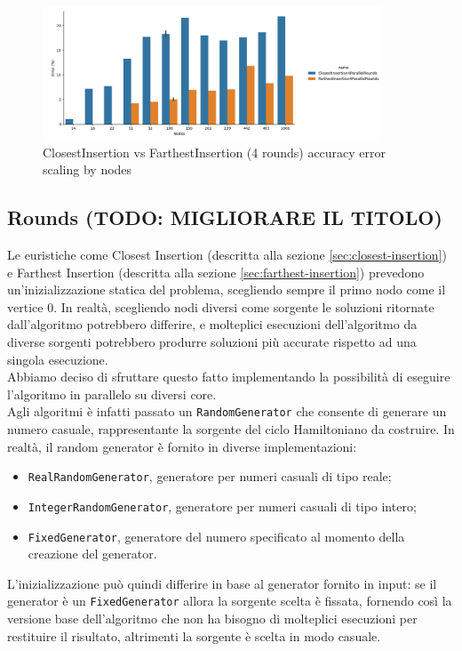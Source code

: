 \begin{figure}[H]
    \centering

    \includegraphics[width=0.9\textwidth]{./images/ClosestInsertion4ParallelRounds_vs_FarthestInsertion4ParallelRounds__approximation_error_.png}

    \caption{ClosestInsertion vs FarthestInsertion (4 rounds) accuracy error scaling by nodes}
    \label{fig:closest-farthest-insertion-4-rounds-accuracy-error}
\end{figure}

\subsection{Rounds (TODO: MIGLIORARE IL TITOLO)}
\label{sec:rounds}

\noindent Le euristiche come Closest Insertion (descritta alla sezione
\ref{sec:closest-insertion}) e Farthest Insertion (descritta alla
sezione \ref{sec:farthest-insertion}) prevedono un'inizializzazione
statica del problema, scegliendo sempre il primo nodo come il vertice
0. In realtà, scegliendo nodi diversi come sorgente le soluzioni
ritornate dall'algoritmo potrebbero differire, e molteplici esecuzioni
dell'algoritmo da diverse sorgenti potrebbero produrre soluzioni più
accurate rispetto ad una singola esecuzione.\\

\noindent Abbiamo deciso di sfruttare questo fatto implementando la
possibilità di eseguire l'algoritmo in parallelo su diversi core.\\

\noindent Agli algoritmi è infatti passato un
\texttt{RandomGenerator} che consente di generare un numero
casuale, rappresentante la sorgente del ciclo Hamiltoniano da
costruire. In realtà, il random generator è fornito in diverse
implementazioni:
\begin{itemize}
    \item \texttt{RealRandomGenerator}, generatore per numeri
      casuali di tipo reale;
    \item \texttt{IntegerRandomGenerator}, generatore per
      numeri casuali di tipo intero;
    \item \texttt{FixedGenerator}, generatore del numero
      specificato al momento della creazione del generator.
\end{itemize}
L'inizializzazione può quindi differire in base al generator fornito
in input: se il generator è un \texttt{FixedGenerator} allora
la sorgente scelta è fissata, fornendo così la versione base
dell'algoritmo che non ha bisogno di molteplici esecuzioni per
restituire il risultato, altrimenti la sorgente è scelta in modo
casuale.\\

